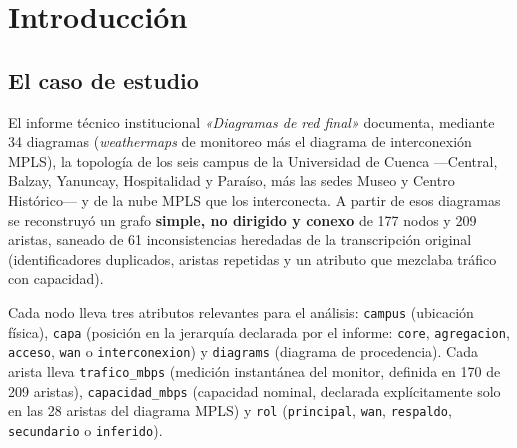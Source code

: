 \documentclass[10pt,a4paper]{extarticle}
\newcommand{\code}[1]{\texttt{\small #1}}
\begin{document}
\newpage

\section{Introducción}

\subsection{El caso de estudio}

El informe técnico institucional \textit{«Diagramas de red final»} documenta, mediante 34
diagramas (\textit{weathermaps} de monitoreo más el diagrama de interconexión MPLS), la
topología de los seis campus de la Universidad de Cuenca ---Central, Balzay, Yanuncay,
Hospitalidad y Paraíso, más las sedes Museo y Centro Histórico--- y de la nube MPLS que
los interconecta. A partir de esos diagramas se reconstruyó un grafo \textbf{simple, no
dirigido y conexo} de 177 nodos y 209 aristas, saneado de 61 inconsistencias heredadas de
la transcripción original (identificadores duplicados, aristas repetidas y un atributo que
mezclaba tráfico con capacidad).

Cada nodo lleva tres atributos relevantes para el análisis: \code{campus} (ubicación
física), \code{capa} (posición en la jerarquía declarada por el informe: \code{core},
\code{agregacion}, \code{acceso}, \code{wan} o \code{interconexion}) y \code{diagrams}
(diagrama de procedencia). Cada arista lleva \code{trafico\_mbps} (medición instantánea
del monitor, definida en 170 de 209 aristas), \code{capacidad\_mbps} (capacidad nominal,
declarada explícitamente solo en las 28 aristas del diagrama MPLS) y \code{rol}
(\code{principal}, \code{wan}, \code{respaldo}, \code{secundario} o \code{inferido}).
\end{document}

